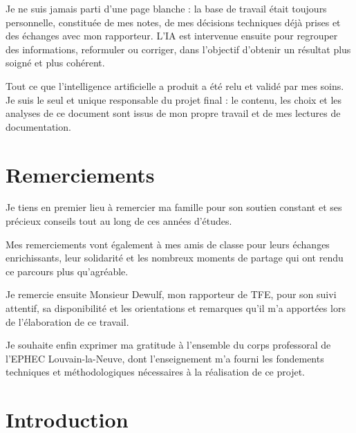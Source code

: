 \documentclass[12pt,a4paper]{article}
\begin{document}
Je ne suis jamais parti d’une page blanche : la base de travail était toujours personnelle, constituée de mes notes, de mes décisions techniques déjà prises et des échanges avec mon rapporteur. L’IA est intervenue ensuite pour regrouper des informations, reformuler ou corriger, dans l’objectif d’obtenir un résultat plus soigné et plus cohérent.

Tout ce que l’intelligence artificielle a produit a été relu et validé par mes soins. Je suis le seul et unique responsable du projet final : le contenu, les choix et les analyses de ce document sont issus de mon propre travail et de mes lectures de documentation.

\newpage
\section*{Remerciements}

Je tiens en premier lieu à remercier ma famille pour son soutien constant et ses précieux conseils tout au long de ces années d’études.

Mes remerciements vont également à mes amis de classe pour leurs échanges enrichissants, leur solidarité et les nombreux moments de partage qui ont rendu ce parcours plus qu'agréable.

Je remercie ensuite Monsieur Dewulf, mon rapporteur de TFE, pour son suivi attentif,
sa disponibilité et les orientations et remarques qu’il m’a apportées lors de l’élaboration de ce travail.

Je souhaite enfin exprimer ma gratitude à l’ensemble du corps professoral de l’EPHEC Louvain-la-Neuve, dont l’enseignement m’a fourni les fondements techniques et méthodologiques nécessaires à la réalisation de ce projet.

\newpage
\tableofcontents

\newpage



\section{Introduction}
\end{document}
